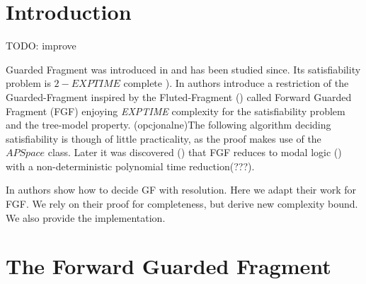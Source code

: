 \documentclass[english, shortabstract]{iithesis}
\author         {Karol Ochman-Milarski}
\theoremstyle{definition} \newtheorem{definition}{Definition}[chapter]
\theoremstyle{remark} \newtheorem{remark}[definition]{Observation}
\theoremstyle{plain} \newtheorem{theorem}[definition]{Theorem}
\theoremstyle{plain} \newtheorem{lemma}[definition]{Lemma}
\begin{document}

\chapter{Introduction}
TODO: improve

Guarded Fragment was introduced in \cite{?} and has been studied since. Its satisfiability problem is $2-\mathit{EXPTIME}$ complete \cite{Gradel1997}).
In \cite{BBE, jelia2021} authors introduce a restriction of the Guarded-Fragment inspired by the Fluted-Fragment (\cite{Fluted}) called Forward Guarded Fragment (FGF) enjoying \emph{EXPTIME} complexity for the satisfiability problem and the tree-model property. 
(opcjonalne)The following algorithm deciding satisfiability is though of little practicality, as the proof makes use of the $APSpace$ class.
Later it was discovered (\cite{?}) that FGF reduces to modal logic (\cite{modal logic}) with a non-deterministic polynomial time reduction(???). 
\par In \cite{resolution-gf} authors show how to decide GF with resolution. Here we adapt their work for FGF.
We rely on their proof for completeness, but derive new complexity bound. We also provide the implementation.

\chapter{The Forward Guarded Fragment}
\end{document}
